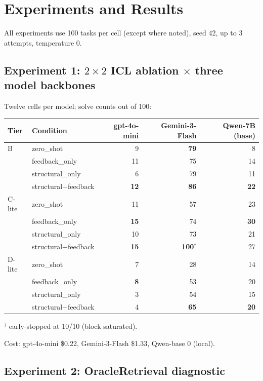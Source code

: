 \documentclass[11pt]{article}
\begin{document}
\section{Experiments and Results}

All experiments use 100 tasks per cell (except where noted), seed 42, up to 3 attempts, temperature 0.

\subsection{Experiment 1: $2\times2$ ICL ablation $\times$ three model backbones}

Twelve cells per model; solve counts out of 100:

\begin{center}\small
\begin{tabular}{llrrr}
\toprule
\textbf{Tier} & \textbf{Condition} & \textbf{gpt-4o-mini} & \textbf{Gemini-3-Flash} & \textbf{Qwen-7B (base)} \\
\midrule
B & zero\_shot & 9 & \textbf{79} & 8 \\
  & feedback\_only & 11 & 75 & 14 \\
  & structural\_only & 6 & 79 & 11 \\
  & structural+feedback & \textbf{12} & \textbf{86} & \textbf{22} \\
\midrule
C-lite & zero\_shot & 11 & 57 & 23 \\
  & feedback\_only & \textbf{15} & 74 & \textbf{30} \\
  & structural\_only & 10 & 73 & 21 \\
  & structural+feedback & \textbf{15} & \textbf{100}$^{\dagger}$ & 27 \\
\midrule
D-lite & zero\_shot & 7 & 28 & 14 \\
  & feedback\_only & \textbf{8} & 53 & 20 \\
  & structural\_only & 3 & 54 & 15 \\
  & structural+feedback & 4 & \textbf{65} & \textbf{20} \\
\bottomrule
\end{tabular}
\end{center}
{\small $^\dagger$ early-stopped at 10/10 (block saturated).}

Cost: gpt-4o-mini \$0.22, Gemini-3-Flash \$1.33, Qwen-base 0 (local).

\subsection{Experiment 2: OracleRetrieval diagnostic}
\end{document}
